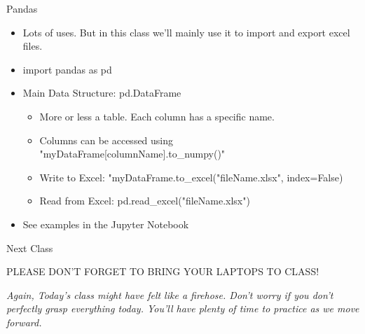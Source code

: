 \documentclass[10pt, aspectratio=169]{beamer}
\begin{document}
\begin{frame}{Pandas}
    \begin{itemize}
        \item Lots of uses. But in this class we'll mainly use it to import and export excel files.
        \item import pandas as pd
        \item Main Data Structure: pd.DataFrame
        \begin{itemize}
            \item More or less a table. Each column has a specific name.
            \item Columns can be accessed using "myDataFrame[columnName].to\_numpy()"
            \item Write to Excel: "myDataFrame.to\_excel("fileName.xlsx", index=False)
            \item Read from Excel: pd.read\_excel("fileName.xlsx")
        \end{itemize}
        \item See examples in the Jupyter Notebook
    \end{itemize}
\end{frame}

\begin{frame}{Next Class}
    \begin{center}
        PLEASE DON'T FORGET TO BRING YOUR LAPTOPS TO CLASS!

        \vspace{1cm}

        \textit{Again, Today's class might have felt like a firehose. Don't worry if you don't perfectly grasp everything today. You'll have plenty of time to practice as we move forward.}
    \end{center}
    

\end{frame}
\end{document}

